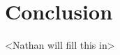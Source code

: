 \documentclass{acm_proc_article-sp}
\begin{document}

\section{Conclusion}

<Nathan will fill this in>

%

%
%


\end{document}
